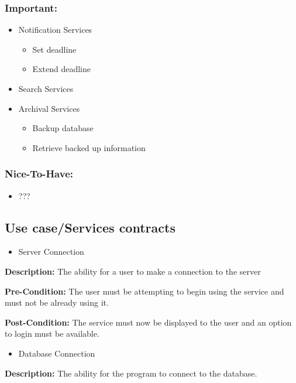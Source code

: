\documentclass[11pt]{article}
\begin{document}
\subsubsection{Important:}	
	\begin{itemize}
		\item Notification Services
		\begin{itemize}
			\item Set deadline
			\item Extend deadline
		\end{itemize}
		\item Search Services
		\item Archival Services
		\begin{itemize}
			\item Backup  database
			\item Retrieve backed up information
		\end{itemize}
	\end{itemize} 
	
\subsubsection{Nice-To-Have:}
	\begin{itemize}
		\item ???
	\end{itemize}

\subsection{Use case/Services contracts}
\begin{itemize}
	\item Server Connection
\end{itemize}

{\raggedright
	\textbf{Description: }The ability for a user to make a connection to the server
}

{\raggedright
	\textbf{Pre-Condition: }The user must be attempting to begin using the service
	and must not be already using it.
}

{\raggedright
	\textbf{Post-Condition:} The service must now be displayed to the user and an
	option to login must be available.
}

\begin{itemize}
	\item Database Connection
\end{itemize}

{\raggedright
	\textbf{Description: }The ability for the program to connect to the database.
}
\end{document}
